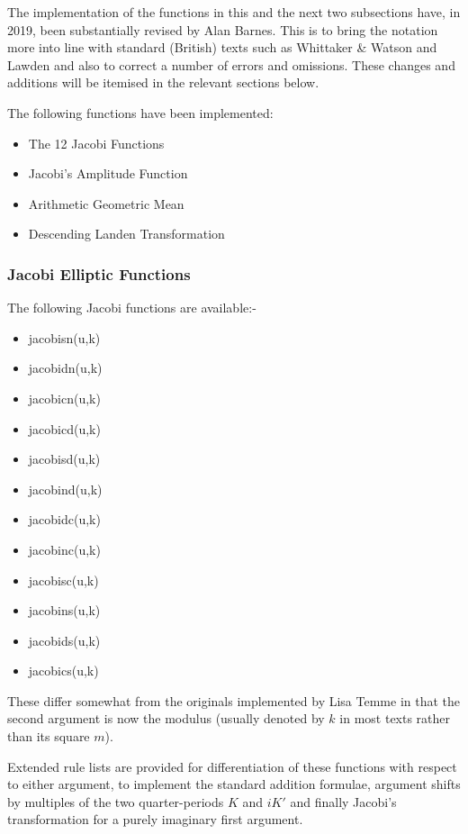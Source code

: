 The implementation of the functions in this and the next two subsections have, in 2019,
been substantially revised by Alan Barnes. This is to bring the
notation more into line with standard (British) texts such as Whittaker
\& Watson \cite{WhittakerWatson:69} and Lawden \cite{Lawden:89} and also to correct
a number of errors and omissions. These changes and additions will be itemised in the relevant
sections below.

The following functions have been implemented:

\begin{itemize}
\item The 12 Jacobi Functions
\item Jacobi's Amplitude Function
\item Arithmetic Geometric Mean
\item Descending Landen Transformation
\end{itemize}
\subsubsection{Jacobi Elliptic Functions}
The following Jacobi functions are available:-

\begin{itemize}
\item jacobisn(u,k)
\item jacobidn(u,k)
\item jacobicn(u,k)
\item jacobicd(u,k)
\item jacobisd(u,k)
\item jacobind(u,k)
\item jacobidc(u,k)
\item jacobinc(u,k)
\item jacobisc(u,k)
\item jacobins(u,k)
\item jacobids(u,k)
\item jacobics(u,k)
\end{itemize}
These differ somewhat from the originals implemented by Lisa Temme in that
the second argument is now the modulus (usually denoted by $k$ in most texts
rather than its square $m$).

Extended rule lists are provided for differentiation of these functions with
respect to either argument, to implement the standard addition formulae,
argument shifts by multiples of the two quarter-periods $K$ and $iK'$ and
finally Jacobi's transformation for a purely imaginary first argument.

